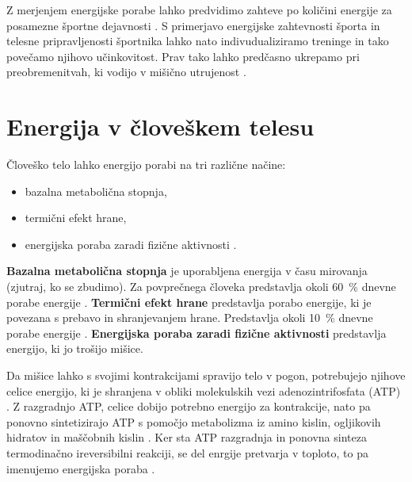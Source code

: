 Z merjenjem energijske porabe lahko predvidimo zahteve po količini energije za posamezne športne dejavnosti \cite{botton2011energy,osgnach2010energy}. S primerjavo energijske zahtevnosti športa in telesne pripravljenosti športnika lahko nato indivudualiziramo treninge in tako povečamo njihovo učinkovitost. Prav tako lahko predčasno ukrepamo pri preobremenitvah, ki vodijo v mišično utrujenost \cite{sahlin1998energy,reilly1997energetics}.













\section{Energija v človeškem telesu}\label{sec:energija}
Človeško telo lahko energijo porabi na tri različne načine:

\begin{itemize}
\item bazalna metabolična stopnja,
\item termični efekt hrane,
\item energijska poraba zaradi fizične aktivnosti \cite{levine2005measurement}.
\end{itemize}

\textbf{Bazalna metabolična stopnja} je uporabljena energija v času mirovanja (zjutraj, ko se zbudimo). Za povprečnega človeka predstavlja okoli \SI{60}{\%} dnevne porabe energije \cite{levine2005measurement}. \textbf{Termični efekt hrane} predstavlja porabo energije, ki je povezana s prebavo in shranjevanjem hrane. Predstavlja okoli \SI{10}{\%} dnevne porabe energije \cite{levine2005measurement}. \textbf{Energijska poraba zaradi fizične aktivnosti} predstavlja energijo, ki jo trošijo mišice. 

Da mišice lahko s svojimi kontrakcijami spravijo telo v pogon, potrebujejo njihove celice energijo, ki je shranjena v obliki molekulskih vezi adenozintrifosfata (ATP) \cite{scott2005misconceptions}. Z razgradnjo ATP, celice dobijo potrebno energijo za kontrakcije, nato pa ponovno sintetizirajo ATP s pomočjo metabolizma iz amino kislin, ogljikovih hidratov in maščobnih kislin \cite{scott2005misconceptions,patel2017aerobic}. Ker sta ATP razgradnja in ponovna sinteza termodinačno ireversibilni reakciji, se del enrgije pretvarja v toploto, to pa imenujemo energijska poraba \cite{scott2005misconceptions}. 

